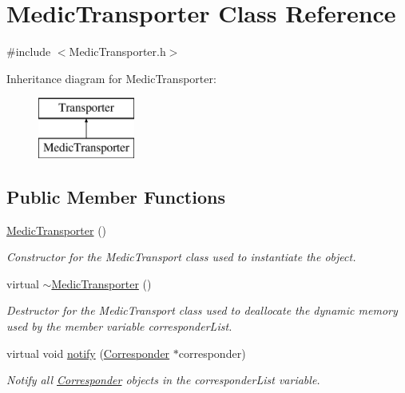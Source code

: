 \hypertarget{class_medic_transporter}{}\section{Medic\+Transporter Class Reference}
\label{class_medic_transporter}


{\ttfamily \#include $<$Medic\+Transporter.\+h$>$}

Inheritance diagram for Medic\+Transporter\+:\begin{figure}[H]
\begin{center}
\leavevmode
\includegraphics[height=2.000000cm]{class_medic_transporter}
\end{center}
\end{figure}
\subsection*{Public Member Functions}
\begin{DoxyCompactItemize}
\item 
\mbox{\hyperlink{class_medic_transporter_a3299a61e61e6d74ff9db3cf66048d710}{Medic\+Transporter}} ()
\begin{DoxyCompactList}\small\item\em Constructor for the Medic\+Transport class used to instantiate the object. \end{DoxyCompactList}\item 
virtual \mbox{\hyperlink{class_medic_transporter_abf9f79be8b43d8bd0a67ad73ce0885f0}{$\sim$\+Medic\+Transporter}} ()
\begin{DoxyCompactList}\small\item\em Destructor for the Medic\+Transport class used to deallocate the dynamic memory used by the member variable corresponder\+List. \end{DoxyCompactList}\item 
virtual void \mbox{\hyperlink{class_medic_transporter_ab77bbb1ad9e370c2045f1bbeb02f620b}{notify}} (\mbox{\hyperlink{class_corresponder}{Corresponder}} $\ast$corresponder)
\begin{DoxyCompactList}\small\item\em Notify all \mbox{\hyperlink{class_corresponder}{Corresponder}} objects in the corresponder\+List variable. \end{DoxyCompactList}\end{DoxyCompactItemize}
